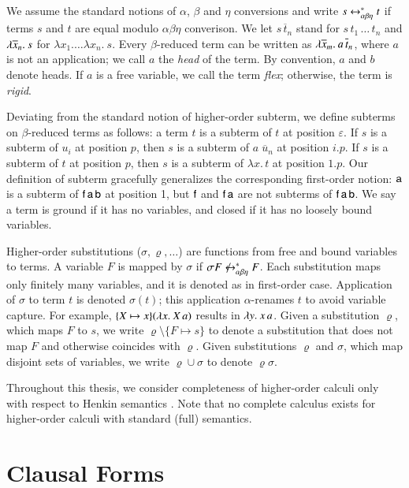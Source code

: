 We assume the standard notions of $\alpha$, $\beta$ and $\eta$ conversions and
write $s \leftrightarrow^*_{\alpha\beta\eta} t$ if terms $s$ and $t$ are equal modulo $\alpha\beta\eta$
converison. We let $s \, \overline{t}_n$ stand for $s \, t_1 \, \ldots \, t_n$
and $\lambda \overline{x}_n.\> s$ for $\lambda x_1. \ldots \lambda x_n. \> s$. Every
$\beta$-reduced term can be written as $\lambda \overline{x}_{m}.\> a \, \overline{t}_{n}$,
where $a$ is not an application; we call $a$ the \emph{head} of the term. By
convention, $a$ and $b$ denote heads. If $a$ is a free variable, we call the term
\emph{flex}; otherwise, the term is \emph{rigid}.

Deviating from the standard notion of higher-order subterm, we define subterms
on $\beta$-reduced terms as follows: a term $t$ is a subterm of $t$ at position
$\varepsilon$. If $s$ is a subterm of $u_i$ at position $p$, then $s$ is a
subterm of $a\;\overline{u}_n$ at position $i.p$. If $s$ is a subterm of $t$ at
position $p$, then $s$ is a subterm of $\lambda x.\, t$ at position $1.p$. Our
definition of subterm gracefully generalizes the corresponding first-order
notion: $\mathsf{a}$ is a subterm of $\mathsf{f} \, \mathsf{a} \, \mathsf{b}$ at position 1,
but $\mathsf{f}$ and $\mathsf{f} \, \mathsf{a}$ are not subterms of $\mathsf{f} \, \mathsf{a}
\, \mathsf{b}$. We say a term is ground if it has no variables, and closed
if it has no loosely bound variables.

Higher-order substitutions ($\sigma,\varrho,\ldots$) are functions from free and bound
variables to terms. A variable $F$ is mapped by $\sigma$ if $ \sigma F \not\equi
F$. Each substitution maps only finitely many variables, and it is denoted as in
first-order case. Application of  $\sigma$ to term $t$ is denoted $\sigma(t)$;
this application $\alpha$-renames $t$ to avoid variable capture. For example,
$\{X \mapsto x\}(\lambda x.\> X \, a)$ results in $\lambda y.\> x \, a$.  Given a substitution
$\varrho$, which maps $F$ to $s$, we write $\varrho\setminus\{F \mapsto s\}$ to
denote a substitution that does not map $F$ and otherwise coincides with
$\varrho$. Given substitutions $\varrho$ and $\sigma$, which map disjoint sets
of variables, we write $\varrho \cup \sigma$ to denote $\varrho\sigma$.

Throughout this thesis, we consider completeness of higher-order calculi only
with respect to Henkin semantics \cite{bm-14-automation-ho}. Note that no
complete calculus exists for higher-order calculi with standard (full)
semantics.

\section{Clausal Forms}


